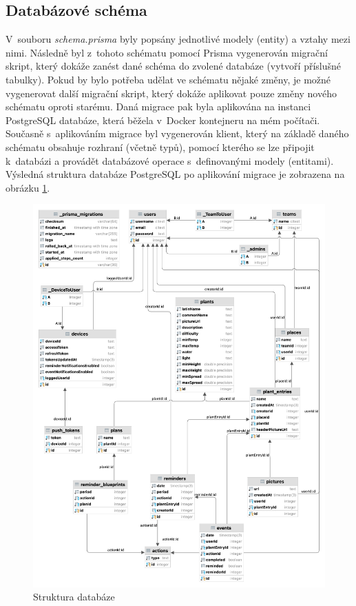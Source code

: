\documentclass[thesis=M,czech]{FITthesis}[2019/12/23]
\begin{document}
\subsection{Databázové schéma}
V~souboru \textit{schema.prisma} byly popsány jednotlivé modely (entity) a vztahy mezi nimi. Následně byl z~tohoto schématu pomocí Prisma vygenerován migrační skript, který dokáže zanést dané schéma do zvolené databáze (vytvoří příslušné tabulky). Pokud by bylo potřeba udělat ve schématu nějaké změny, je možné vygenerovat další migrační skript, který dokáže aplikovat pouze změny nového schématu oproti starému. Daná migrace pak byla aplikována na instanci PostgreSQL databáze, která běžela v~Docker kontejneru na mém počítači. Současně s~aplikováním migrace byl vygenerován klient, který na základě daného schématu obsahuje rozhraní (včetně typů), pomocí kterého se lze připojit k~databázi a provádět databázové operace s~definovanými modely (entitami). Výsledná struktura databáze PostgreSQL po aplikování migrace je zobrazena na obrázku \ref{img:db-structure}.

\begin{figure}
	\centering
	\includegraphics[width=1\linewidth]{images/db-structure.png}
  	\caption{Struktura databáze}
  	\label{img:db-structure}
\end{figure}
\end{document}
